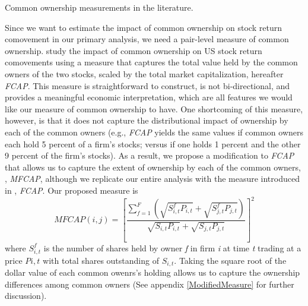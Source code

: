 
	{\begin{table}[htbp]
			\centering
			\scriptsize
			\caption{ Common ownership measurements in the literature.}
			\label{maasurmentsSummary}
			\resizebox{\textwidth}{!}{
				
			}
		\end{table}
	}
	
Since we want to estimate the impact of common ownership on stock return comovement in our primary analysis, we need a pair-level measure of common ownership. \cite{AntonPolk} study the impact of common ownership on US stock return comovements using a measure that captures the total value held by the common owners of the two stocks, scaled by the total market capitalization, hereafter \textit{FCAP}. This measure is straightforward to construct, is not bi-directional, and provides a meaningful economic interpretation, which are all features we would like our measure of common ownership to have. One shortcoming of this measure, however, is that it does not capture the distributional impact of ownership by each of the common owners (e.g., \textit{FCAP} yields the same values if common owners each hold 5 percent of a firm's stocks; versus if one holds 1 percent and the other 9 percent of the firm's stocks). As a result, we propose a modification to \textit{FCAP} that allows us to capture the extent of ownership by each of the common owners, , \textit{MFCAP}, although we replicate our entire analysis with the measure introduced in \cite{AntonPolk}, \textit{FCAP}. Our proposed measure is
\begin{equation}
	MFCAP(i, j) =  [\frac{\sum_{f =1}^{F}(\sqrt{S^f_{i,t}P_{i,t}}+\sqrt{S^f_{j,t}P_{j,t}})}{\sqrt{S_{i,t}P_{i,t}} + \sqrt{S_{j,t}P_{j,t}}}]^2 
	\label{sqrt}
\end{equation}
where $ S^f_{i,t}$ is the number of shares held by owner \textit{f} in firm \textit{i} at time \textit{t} trading at a price $ P{i,t} $ with total shares outstanding of $ S_{i,t} $. Taking the square root of the dollar value of each common owenrs's holding allows us to capture the ownership differences among common owners ({See appendix \ref{ModifiedMeasure}} for further discussion). 

